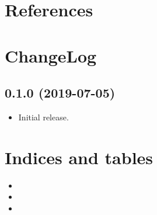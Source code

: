 \documentclass[letterpaper,10pt,english]{sphinxmanual}
\begin{document}
\chapter{References}
\label{\detokenize{modules/index:references}}\label{\detokenize{modules/index::doc}}

\chapter{ChangeLog}
\label{\detokenize{CHANGELOG:changelog}}\label{\detokenize{CHANGELOG::doc}}

\section{0.1.0 (2019-07-05)}
\label{\detokenize{CHANGELOG:id1}}\begin{itemize}
\item {} 
Initial release.

\end{itemize}


\chapter{Indices and tables}
\label{\detokenize{index:indices-and-tables}}\begin{itemize}
\item {} 

\item {} 

\item {} 

\end{itemize}



\renewcommand{\indexname}{Index}
\printindex
\end{document}
